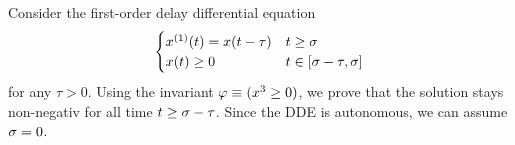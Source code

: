             Consider the first-order delay differential equation
            \begin{equation*}
                \begin{cases}
                    \D{x}(t) = x(t-\tau) & t \geq \tzero\\
                    x(t) \geq 0 & t \in [\tzero-\tau,\tzero]
                \end{cases}
            \end{equation*}
            for any $\tau>0$.
            Using the invariant $\varphi\equiv(x^3\geq 0)$, we prove that the solution stays non-negativ for all time $t\geq\sigma-\tau$.
            Since the DDE is autonomous, we can assume $\sigma=0$.
            \footnotesize
            \begin{sequentdeduction}
\end{sequentdeduction}
